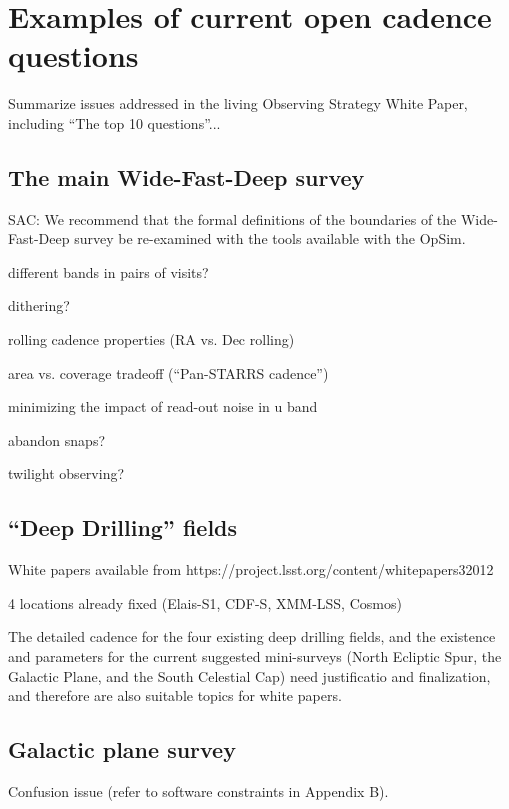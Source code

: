 \documentclass[DM,lsstdraft,toc,usenatbib]{lsstdoc}
\begin{document}
\appendix


\section{Examples of current open cadence questions} 

Summarize issues addressed in the living Observing Strategy White Paper, 
including ``The top 10 questions''... 


\subsection{The main Wide-Fast-Deep survey} 

SAC:  We recommend that the formal definitions of the boundaries of the
     Wide-Fast-Deep survey be re-examined with the tools available with
     the OpSim. 


different bands in pairs of visits?

dithering? 

rolling cadence properties (RA vs. Dec rolling) 

area vs. coverage tradeoff  (``Pan-STARRS cadence'')

minimizing the impact of read-out noise in u band

abandon snaps?

twilight observing? 


\subsection{``Deep Drilling'' fields} 

White papers available from  https://project.lsst.org/content/whitepapers32012

4 locations already fixed (Elais-S1, CDF-S, XMM-LSS, Cosmos) 


The detailed cadence for the four existing deep drilling fields, and the existence and parameters 
for the current suggested mini-surveys (North Ecliptic Spur, the Galactic Plane, and the South 
Celestial Cap) need justificatio and finalization, and therefore are also suitable topics for white papers.  



\subsection{Galactic plane survey}

Confusion issue (refer to software constraints in Appendix B). 
\end{document}
